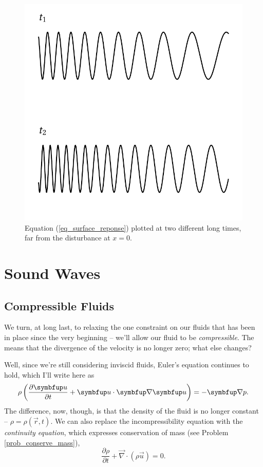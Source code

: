 \begin{figure}
\centering\includegraphics[width=0.7\linewidth]{Figures/Chapter5/fig_local_wave_example}
\caption{Equation (\ref{eq_surface_reponse}) plotted at two different long times, far from the disturbance at $x=0$.}
\label{fig_local_wave_example}
\end{figure}



%
%

\section{Sound Waves}


\subsection{Compressible Fluids}
\label{sec_comp_fluids}


We turn, at long last, to relaxing the one constraint on our fluids that has been in place since the very beginning -- we'll allow our fluid to be \emph{compressible}.  The means that the divergence of the velocity is no longer zero; what else changes?

Well, since we're still considering inviscid fluids, Euler's equation continues to hold, which I'll write here as
\begin{equation}
\rho \left( \dfdx{\vec{u}}{t} + \vec{u} \cdot \grad \vec{u} \right) = -\grad p.
\end{equation}
The difference, now, though, is that the density of the fluid is no longer constant -- $\rho = \rho(\vec{r}, t)$.  We can also replace the incompressibility equation with the \emph{continuity equation}, which expresses conservation of mass (see Problem \ref{prob_conserve_mass}),
\begin{equation}
\frac{\partial \rho}{\partial t} + \vec{\nabla} \cdot (\rho \vec{u} ) = 0.
\end{equation}

